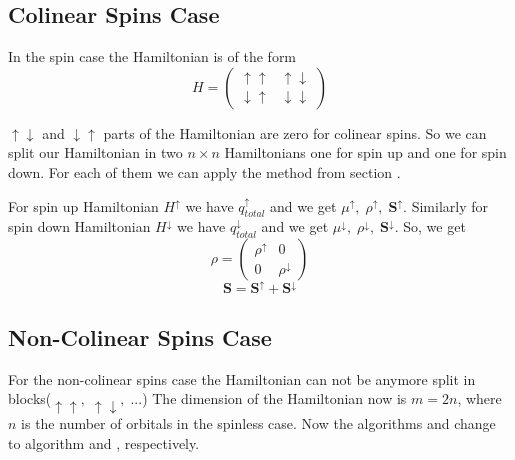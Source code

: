 \subsection{Colinear Spins Case}
\par{In the spin case the Hamiltonian is of the form}
\begin{equation}
\label{spinH}
H=\left(
\begin{array}{c|c}
\uparrow \uparrow & \uparrow \downarrow \\
\hline
\downarrow \uparrow & \downarrow \downarrow
\end{array}
\right)
\end{equation}
\par{$\uparrow \downarrow$ and $\downarrow \uparrow$ parts of the Hamiltonian are
zero for colinear spins. So we can split our Hamiltonian in two $n \times n$
Hamiltonians one for spin up and one for spin down. For each of them we can apply
the method from section }.
\par{For spin up Hamiltonian $H^{\uparrow}$ we have $q_{total}^{\uparrow}$ and we get
$\mu^{\uparrow},\;\rho^{\uparrow},\;\bm{S}^{\uparrow}$. Similarly for spin down Hamiltonian $H^{\downarrow}$
we have $q_{total}^{\downarrow}$ and we get
$\mu^{\downarrow},\;\rho^{\downarrow},\;\bm{S}^{\downarrow}$. So, we get}
\begin{equation}
\rho=\left(
\begin{array}{c|c}
\rho^{\uparrow} & 0 \\
\hline
0 & \rho^{\downarrow}
\end{array}
\right)
\end{equation}
\begin{equation}
\bm{S}=\bm{S^{\uparrow}}+\bm{S^{\downarrow}}
\end{equation}
\subsection{Non-Colinear Spins Case}
\par{For the non-colinear spins case the Hamiltonian  can not be anymore split in blocks($\uparrow \uparrow,\;\uparrow \downarrow,\;...$)
The dimension of the Hamiltonian now is $m=2n$, where $n$ is the number of orbitals
in the spinless case. Now the algorithms  and  change
to algorithm  and , respectively.}


